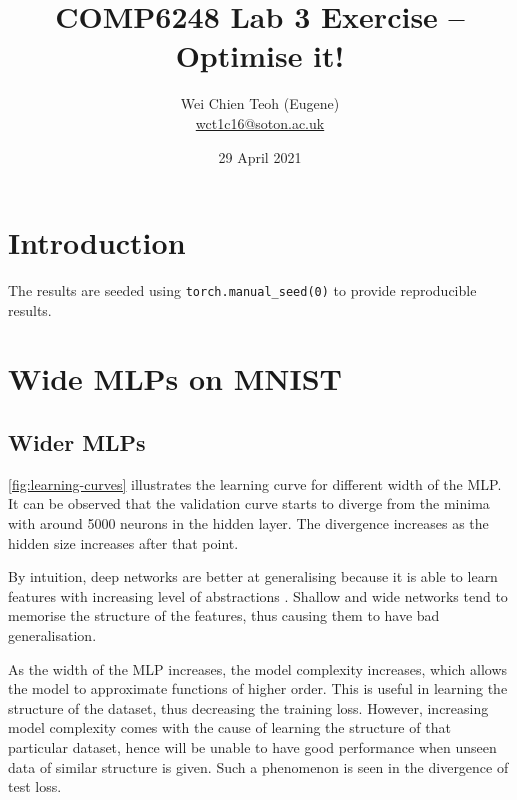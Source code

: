\documentclass[twocolumn]{article}
\title{\Large COMP6248 Lab 3 Exercise -- Optimise it!}
\author{\small Wei Chien Teoh (Eugene)\\\bigskip \href{mailto:wct1c16@soton.ac.uk}{wct1c16@soton.ac.uk}}
\date{\small 29 April 2021}
\begin{document}
\maketitle

\section*{Introduction}

The results are seeded using \lstinline{torch.manual_seed(0)} to provide reproducible results.

\section{Wide MLPs on MNIST}

\subsection{Wider MLPs}

\cref{fig:learning-curves} illustrates the learning curve for different width of the MLP. It can be observed that the validation curve starts to diverge from the minima with around 5000 neurons in the hidden layer. The divergence increases as the hidden size increases after that point.

By intuition, deep networks are better at generalising because it is able to learn features with increasing level of abstractions \autocite{eldanPowerDepthFeedforward2016}. Shallow and wide networks tend to memorise the structure of the features, thus causing them to have bad generalisation.

As the width of the MLP increases, the model complexity increases, which allows the model to approximate functions of higher order. This is useful in learning the structure of the dataset, thus decreasing the training loss. However, increasing model complexity comes with the cause of learning the structure of that particular dataset, hence will be unable to have good performance when unseen data of similar structure is given. Such a phenomenon is seen in the divergence of test loss.
\end{document}
